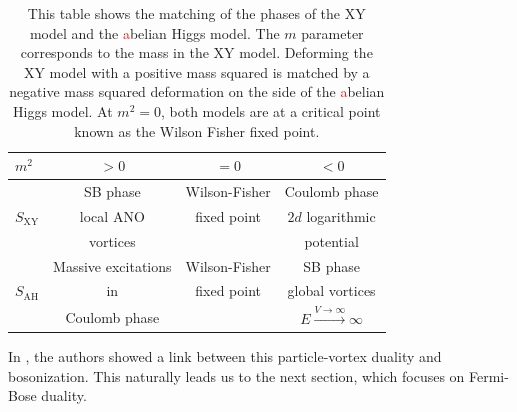     \begin{table}
\begin{center}
  \begin{tabular}{| l | c | c | c|}
      \hline
    $m^2$           &  $>0$                  & $=0$                           &  $<0$                                               \\\hline
                    &  SB phase              & Wilson-Fisher &  Coulomb phase                                      \\                             
    $S_{\text{XY}}$ &  local ANO             &  fixed point                   &  $2d$ logarithmic                                   \\                           
                    &  vortices              &                                &  potential                                          \\\hline
                    &   Massive excitations  & Wilson-Fisher &  SB phase                                           \\                
    $S_{\text{AH}}$ &  in                    & fixed point                    &  global vortices                                    \\                                  
                    &  Coulomb phase         &                                &  $E\xrightarrow{V \rightarrow \infty} \infty$       \\                      
    \hline
  \end{tabular}
\end{center}
        \caption[This table shows the matching of the phases of the XY model and the \textcolor{red}{a}belian Higgs model.]{This table shows the matching of the phases of the XY model and the \textcolor{red}{a}belian Higgs model. The $m$ parameter corresponds to the mass in the XY model. Deforming the XY model with a positive mass squared is matched by a negative mass squared deformation on the side of the \textcolor{red}{a}belian Higgs model. At $m^2=0$, both models are at a critical point known as the Wilson Fisher fixed point. }
        \label{table:PV_Duality}
    \end{table}
In \cite{Karch:2016sxi}, the authors showed a link between this particle-vortex duality and bosonization. This naturally leads us to the next section, which focuses on Fermi-Bose duality.
%

